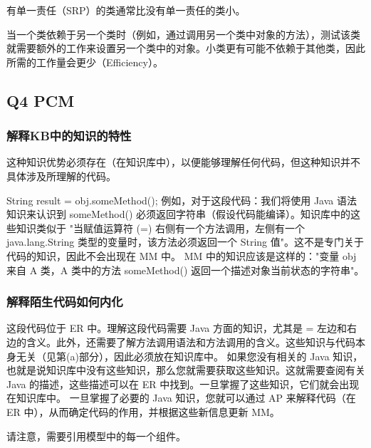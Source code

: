 \documentclass[]{ctexbook}
\begin{document}
有单一责任（SRP）的类通常比没有单一责任的类小。

当一个类依赖于另一个类时（例如，通过调用另一个类中对象的方法），测试该类就需要额外的工作来设置另一个类中的对象。小类更有可能不依赖于其他类，因此所需的工作量会更少（Efficiency）。

\subsection{Q4 PCM}
\subsubsection{解释KB中的知识的特性}

这种知识优势必须存在（在知识库中），以便能够理解任何代码，但这种知识并不具体涉及所理解的代码。

String result = obj.someMethod(); 例如，对于这段代码：我们将使用 Java 语法知识来认识到 someMethod() 必须返回字符串（假设代码能编译）。知识库中的这些知识类似于 "当赋值运算符 (=) 右侧有一个方法调用，左侧有一个 java.lang.String 类型的变量时，该方法必须返回一个 String 值"。这不是专门关于代码的知识，因此不会出现在 MM 中。
MM 中的知识应该是这样的："变量 obj 来自 A 类，A 类中的方法 someMethod() 返回一个描述对象当前状态的字符串"。

\subsubsection{解释陌生代码如何内化}
这段代码位于 ER 中。理解这段代码需要 Java 方面的知识，尤其是 = 左边和右边的含义。此外，还需要了解方法调用语法和方法调用的含义。这些知识与代码本身无关（见第(a)部分），因此必须放在知识库中。
如果您没有相关的 Java 知识，也就是说知识库中没有这些知识，那么您就需要获取这些知识。这就需要查阅有关 Java 的描述，这些描述可以在 ER 中找到。一旦掌握了这些知识，它们就会出现在知识库中。
一旦掌握了必要的 Java 知识，您就可以通过 AP 来解释代码（在 ER 中），从而确定代码的作用，并根据这些新信息更新 MM。

请注意，需要引用模型中的每一个组件。
\end{document}
